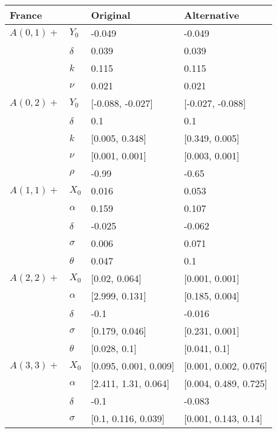 \begin{tabular}{llll}
	\toprule
	France&       &               Original &            Alternative \\
	\midrule
	$A(0, 1)+$ & $Y_0$ &                 -0.049 &                 -0.049 \\
	& $\delta$ &                  0.039 &                  0.039 \\
	& $k$ &                  0.115 &                  0.115 \\
	& $\nu$ &                  0.021 &                  0.021 \\
	$A(0, 2)+$ & $Y_0$ &       [-0.088, -0.027] &       [-0.027, -0.088] \\
	& $\delta$ &                    0.1 &                    0.1 \\
	& $k$ &         [0.005, 0.348] &         [0.349, 0.005] \\
	& $\nu$ &         [0.001, 0.001] &         [0.003, 0.001] \\
	& $\rho$ &                  -0.99 &                  -0.65 \\
	$A(1, 1)+$ & $X_0$ &                  0.016 &                  0.053 \\
	& $\alpha$ &                  0.159 &                  0.107 \\
	& $\delta$ &                 -0.025 &                 -0.062 \\
	& $\sigma$ &                  0.006 &                  0.071 \\
	& $\theta$ &                  0.047 &                    0.1 \\
	$A(2, 2)+$ & $X_0$ &          [0.02, 0.064] &         [0.001, 0.001] \\
	& $\alpha$ &         [2.999, 0.131] &         [0.185, 0.004] \\
	& $\delta$ &                   -0.1 &                 -0.016 \\
	& $\sigma$ &         [0.179, 0.046] &         [0.231, 0.001] \\
	& $\theta$ &           [0.028, 0.1] &           [0.041, 0.1] \\
	$A(3, 3)+$ & $X_0$ &  [0.095, 0.001, 0.009] &  [0.001, 0.002, 0.076] \\
	& $\alpha$ &   [2.411, 1.31, 0.064] &  [0.004, 0.489, 0.725] \\
	& $\delta$ &                   -0.1 &                 -0.083 \\
	& $\sigma$ &    [0.1, 0.116, 0.039] &   [0.001, 0.143, 0.14] \\

\end{tabular}
